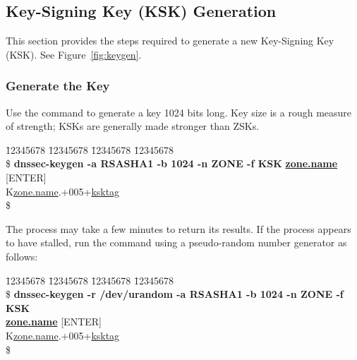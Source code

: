 
\clearpage
\subsection{Key-Signing Key (KSK) Generation}
\label{genksk}

This section provides the steps required to generate a new Key-Signing Key
(KSK).  See Figure~\ref{fig:keygen}.


\subsubsection{Generate the Key}

Use the  command to generate a key 1024 bits long.  Key
size is a rough measure of strength; KSKs are generally made stronger than
ZSKs.

\begin{tabbing}
\hspace{0.5in} \= 12345678 \= 12345678 \= 12345678 \= 12345678 \kill \\
\hspace{0.5in} \$ {\bf dnssec-keygen -a RSASHA1 -b 1024 -n ZONE -f KSK} {\bf \underline{zone.name}} \\
\hspace{0.5in} [ENTER] \\
\hspace{0.5in} K\underline{zone.name}.+005+\underline{ksktag} \\
\hspace{0.5in} \$ \\
\end{tabbing}

The process may take a few minutes to return its results. If the process
appears to have stalled, run the command using a pseudo-random number
generator as follows:

\begin{tabbing}
\hspace{0.5in} \= 12345678 \= 12345678 \= 12345678 \= 12345678 \kill \\
\hspace{0.5in} \$ {\bf dnssec-keygen -r /dev/urandom -a RSASHA1 -b 1024 -n ZONE -f KSK} \\
\hspace{0.5in} {\bf \underline{zone.name}} [ENTER] \\
\hspace{0.5in} K\underline{zone.name}.+005+\underline{ksktag} \\
\hspace{0.5in} \$ \\
\end{tabbing}

